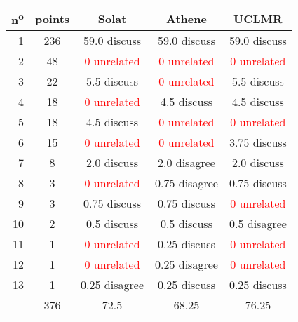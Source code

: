 \begin{center}
 \begin{tabular}{ r | c || c c c }
  n\textsuperscript{o} & points & Solat                        & Athene                       & UCLMR                        \\ \hline
  1                    & 236    & 59.0 discuss                 & 59.0 discuss                 & 59.0 discuss                 \\
  2                    & 48     & \textcolor{red}{0 unrelated} & \textcolor{red}{0 unrelated} & \textcolor{red}{0 unrelated} \\
  3                    & 22     & 5.5 discuss                  & \textcolor{red}{0 unrelated} & 5.5 discuss                  \\
  4                    & 18     & \textcolor{red}{0 unrelated} & 4.5 discuss                  & 4.5 discuss                  \\
  5                    & 18     & 4.5 discuss                  & \textcolor{red}{0 unrelated} & \textcolor{red}{0 unrelated} \\
  6                    & 15     & \textcolor{red}{0 unrelated} & \textcolor{red}{0 unrelated} & 3.75 discuss                 \\
  7                    & 8      & 2.0 discuss                  & 2.0 disagree                 & 2.0 discuss                  \\
  8                    & 3      & \textcolor{red}{0 unrelated} & 0.75 disagree                & 0.75 discuss                 \\
  9                    & 3      & 0.75 discuss                 & 0.75 discuss                 & \textcolor{red}{0 unrelated} \\
  10                   & 2      & 0.5 discuss                  & 0.5 discuss                  & 0.5 disagree                 \\
  11                   & 1      & \textcolor{red}{0 unrelated} & 0.25 discuss                 & \textcolor{red}{0 unrelated} \\
  12                   & 1      & \textcolor{red}{0 unrelated} & 0.25 disagree                & \textcolor{red}{0 unrelated} \\
  13                   & 1      & 0.25 disagree                & 0.25 discuss                 & 0.25 discuss                 \\ \hline
                       & 376    & 72.5                         & 68.25                        & 76.25                        \\
 \end{tabular}
\end{center}
